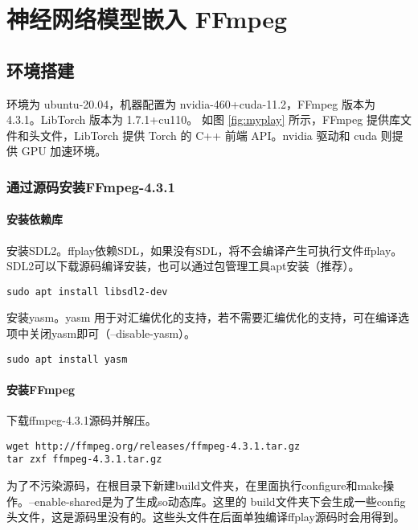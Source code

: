 
\chapter{神经网络模型嵌入 FFmpeg}

\section{环境搭建}

环境为 ubuntu-20.04，机器配置为 nvidia-460+cuda-11.2，FFmpeg 版本为 4.3.1。LibTorch 版本为 1.7.1+cu110。
如图 \ref{fig:myplay} 所示，FFmpeg 提供库文件和头文件，LibTorch 提供 Torch 的 C++ 前端 API。nvidia 驱动和 cuda 则提供 GPU 加速环境。

\subsection{通过源码安装FFmpeg-4.3.1}

\subsubsection{安装依赖库}

安装SDL2。ffplay依赖SDL，如果没有SDL，将不会编译产生可执行文件ffplay。SDL2可以下载源码编译安装，也可以通过包管理工具apt安装（推荐）。

\begin{lstlisting}
sudo apt install libsdl2-dev
\end{lstlisting}

安装yasm。yasm 用于对汇编优化的支持，若不需要汇编优化的支持，可在编译选项中关闭yasm即可（–disable-yasm）。

\begin{lstlisting}
sudo apt install yasm
\end{lstlisting}

\subsubsection{安装FFmpeg}

下载ffmpeg-4.3.1源码并解压。

\begin{lstlisting}
wget http://ffmpeg.org/releases/ffmpeg-4.3.1.tar.gz
tar zxf ffmpeg-4.3.1.tar.gz
\end{lstlisting}

为了不污染源码，在根目录下新建build文件夹，在里面执行configure和make操作。--enable-shared是为了生成so动态库。这里的
build文件夹下会生成一些config头文件，这是源码里没有的。这些头文件在后面单独编译ffplay源码时会用得到。

